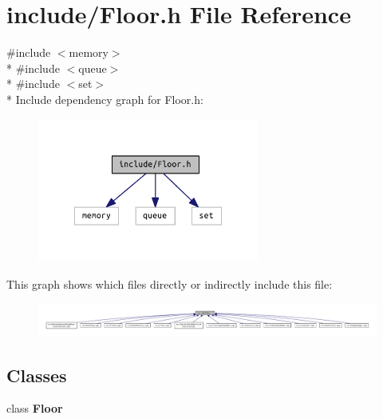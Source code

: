 \section{include/\+Floor.h File Reference}
\label{_floor_8h}
{\ttfamily \#include $<$memory$>$}\\*
{\ttfamily \#include $<$queue$>$}\\*
{\ttfamily \#include $<$set$>$}\\*
Include dependency graph for Floor.\+h\+:
\nopagebreak
\begin{figure}[H]
\begin{center}
\leavevmode
\includegraphics[width=206pt]{_floor_8h__incl}
\end{center}
\end{figure}
This graph shows which files directly or indirectly include this file\+:
\nopagebreak
\begin{figure}[H]
\begin{center}
\leavevmode
\includegraphics[width=350pt]{_floor_8h__dep__incl}
\end{center}
\end{figure}
\subsection*{Classes}
\begin{DoxyCompactItemize}
\item 
class {\bf Floor}
\end{DoxyCompactItemize}
